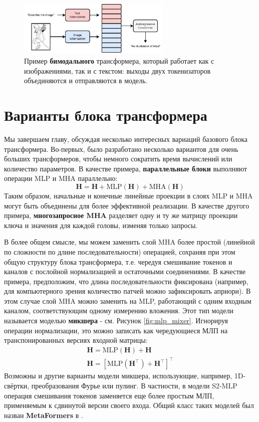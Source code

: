 \begin{figure}
    \centering
    \hspace{1em}\includegraphics[width=0.65\textwidth]{images/multimodal_transformer}
    \caption{Пример \textbf{бимодального} трансформера, который работает как с изображениями, так и с текстом: выходы двух токенизаторов объединяются и отправляются в модель.}
    \label{fig:multimodal_transformer}
\end{figure}

\section{Варианты блока трансформера}
\label{subsec:mha_variants}

Мы завершаем главу, обсуждая несколько интересных вариаций базового блока трансформера. Во-первых, было разработано несколько вариантов для очень больших трансформеров, чтобы немного сократить время вычислений или количество параметров. В качестве примера, \textbf{параллельные блоки} \cite{dehghani2023scaling} выполняют операции MLP и MHA параллельно:
%
$$
\mathbf{H} = \mathbf{H}+\text{MLP}(\mathbf{H})+\text{MHA}(\mathbf{H})
$$
%
Таким образом, начальные и конечные линейные проекции в слоях MLP и MHA могут быть объединены для более эффективной реализации. В качестве другого примера, \textbf{многозапросное MHA} \cite{shazeer2019fast} разделяет одну и ту же матрицу проекции ключа и значения для каждой головы, изменяя только запросы.

В более общем смысле, мы можем заменить слой MHA более простой (линейной по сложности по длине последовательности) операцией, сохраняя при этом общую структуру блока трансформера, т.е. чередуя смешивание токенов и каналов с послойной нормализацией и остаточными соединениями. В качестве примера, предположим, что длина последовательности фиксирована (например, для компьютерного зрения количество патчей можно зафиксировать априори). В этом случае слой MHA можно заменить на MLP, работающий с одним входным каналом, соответствующим одному измерению вложения. Этот тип модели называется моделью \textbf{микшера} \cite{tolstikhin2021mlp} - см. Рисунок \ref{fig:mlp_mixer}.
Игнорируя операции нормализации, это можно записать как чередующиеся МЛП на транспонированных версиях входной матрицы:
%
\begin{gather}
\mathbf{H}=\text{MLP}(\mathbf{H})+\mathbf{H} \\
\mathbf{H}= \left[\text{MLP}(\mathbf{H}^\top)+\mathbf{H}^\top\right]^\top
\end{gather}
%
Возможны и другие варианты модели микшера, использующие, например, 1D-свёртки, преобразования Фурье или пулинг. В частности, в модели S2-MLP \cite{yu2022s2} операция смешивания токенов заменяется еще более простым МЛП, применяемым к сдвинутой версии своего входа. Общий класс таких моделей был назван \textbf{MetaFormers} в \cite{yu2022metaformer}.

